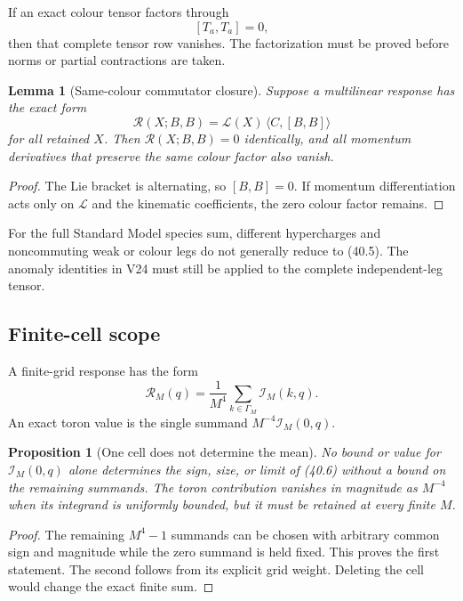 \documentclass[11pt]{article}
\newtheorem{lemma}[theorem]{Lemma}
\newtheorem{proposition}[theorem]{Proposition}
\begin{document}
If an exact colour tensor factors through
\[
 [T_a,T_a]=0,
 \tag{40.4}
\]
then that complete tensor row vanishes.  The factorization must be
proved before norms or partial contractions are taken.

\begin{lemma}[Same-colour commutator closure]
\label{lem:v11v40-colour}
Suppose a multilinear response has the exact form
\[
 \mathcal R(X;B,B)
 =
 \mathcal L(X)\,\langle C,[B,B]\rangle
 \tag{40.5}
\]
for all retained \(X\).  Then \(\mathcal R(X;B,B)=0\) identically, and
all momentum derivatives that preserve the same colour factor also
vanish.
\end{lemma}

\begin{proof}
The Lie bracket is alternating, so \([B,B]=0\).  If momentum
differentiation acts only on \(\mathcal L\) and the kinematic
coefficients, the zero colour factor remains.
\end{proof}

For the full Standard Model species sum, different hypercharges and
noncommuting weak or colour legs do not generally reduce to (40.5).
The anomaly identities in V24 must still be applied to the complete
independent-leg tensor.

\subsection{Finite-cell scope}

A finite-grid response has the form
\[
 \mathcal R_M(q)
 =
 \frac1{M^4}\sum_{k\in\Gamma_M}\mathcal I_M(k,q).
 \tag{40.6}
\]
An exact toron value is the single summand
\(M^{-4}\mathcal I_M(0,q)\).

\begin{proposition}[One cell does not determine the mean]
\label{prop:v11v40-one-cell}
No bound or value for \(\mathcal I_M(0,q)\) alone determines the sign,
size, or limit of (40.6) without a bound on the remaining summands.
The toron contribution vanishes in magnitude as \(M^{-4}\) when its
integrand is uniformly bounded, but it must be retained at every finite
\(M\).
\end{proposition}

\begin{proof}
The remaining \(M^4-1\) summands can be chosen with arbitrary common
sign and magnitude while the zero summand is held fixed.  This proves
the first statement.  The second follows from its explicit grid weight.
Deleting the cell would change the exact finite sum.
\end{proof}
\end{document}

